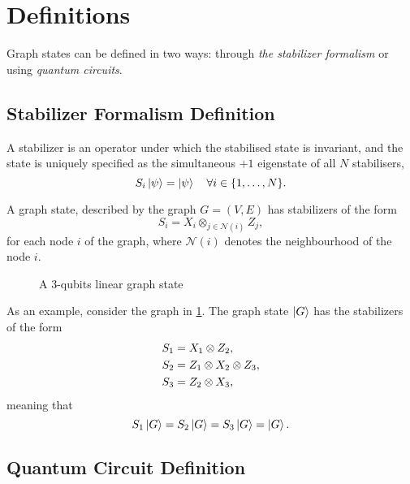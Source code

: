\section{Definitions}
\label{Sec:graph_definition}

Graph states can be defined in two ways: through \emph{the stabilizer formalism} or using \emph{quantum circuits}.

\subsection{Stabilizer Formalism Definition}

A stabilizer is an operator under which the stabilised state is invariant, and the state is uniquely specified as the simultaneous $+1$ eigenstate of all $N$ stabilisers,
\begin{equation}
    S_i \ket{\psi} = \ket{\psi} \quad \forall i \in \{1, \ldots, N\} .
\end{equation}

A graph state, described by the graph $G = (V, E)$ has stabilizers of the form
\begin{equation}
    S_i = X_i \otimes_{j \in \mathcal{N}(i)} Z_j ,
\end{equation}
for each node $i$ of the graph, where $\mathcal{N}(i)$ denotes the neighbourhood of the node $i$.

\begin{figure}
    \centering
    
    \vspace{-1cm}
    \caption{A $3$-qubits linear graph state}
    \label{fig:simple_3_graph}
\end{figure}

As an example, consider the graph in \cref{fig:simple_3_graph}.
The graph state $\ket{G}$ has the stabilizers of the form
\begin{align}
    S_1 &= X_1 \otimes Z_2 , \notag \\
    S_2 &= Z_1 \otimes X_2 \otimes Z_3 , \label{eq:stabilizers} \\
    S_3 &= Z_2 \otimes X_3 , \notag
\end{align}
meaning that
\begin{equation}
    S_1 \ket{G} = 
    S_2 \ket{G} = 
    S_3 \ket{G} = 
    \ket{G} .
\end{equation}

\subsection{Quantum Circuit Definition}

